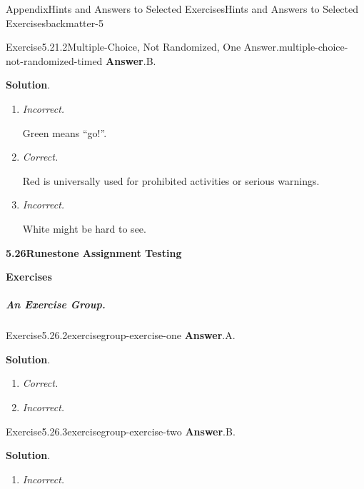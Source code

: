 \documentclass[oneside,10pt,]{book}
\newcommand{\blocktitlefont}{\relax}
\newcommand{\lititle}[1]{{\slshape#1}}
\numberwithin{equation}{section}
\begin{document}
\begin{solutions-chapter}{Appendix}{Hints and Answers to Selected Exercises}{}{Hints and Answers to Selected Exercises}{}{}{backmatter-5}
\begin{divisionsolution}{Exercise}{5.21.2}{Multiple-Choice, Not Randomized, One Answer.}{multiple-choice-not-randomized-timed}
\noindent\textbf{\blocktitlefont Answer}.\hypertarget{multiple-choice-not-randomized-timed-6-back}{}\quad{}B.%
\par\smallskip%
\noindent\textbf{\blocktitlefont Solution}.\hypertarget{multiple-choice-not-randomized-timed-7-back}{}\quad{}%
\begin{enumerate}[label={\Alph*.}]
\item{}\lititle{Incorrect.}\par%
Green means ``go!''.%
\item{}\lititle{Correct.}\par%
Red is universally used for prohibited activities or serious warnings.%
\item{}\lititle{Incorrect.}\par%
White might be hard to see.%
\end{enumerate}
%
\end{divisionsolution}%
\par\medskip
\noindent\textbf{\Large{}5.26\space\textperiodcentered\space{}Runestone Assignment Testing}
\par\medskip
\noindent\textbf{\large{}\textperiodcentered\space{}Exercises}
\subparagraph[{An Exercise Group}]{An Exercise Group.}
\begin{exercisegroup}
\begin{divisionsolutioneg}{Exercise}{5.26.2}{}{exercisegroup-exercise-one}%
\noindent\textbf{\blocktitlefont Answer}.\hypertarget{exercisegroup-exercise-one-2-back}{}\quad{}A.%
\par\smallskip%
\noindent\textbf{\blocktitlefont Solution}.\hypertarget{exercisegroup-exercise-one-3-back}{}\quad{}%
\begin{enumerate}[label={\Alph*.}]
\item{}\lititle{Correct.}\par%
%
\item{}\lititle{Incorrect.}\par%
%
\end{enumerate}
%
\end{divisionsolutioneg}%
\begin{divisionsolutioneg}{Exercise}{5.26.3}{}{exercisegroup-exercise-two}%
\noindent\textbf{\blocktitlefont Answer}.\hypertarget{exercisegroup-exercise-two-2-back}{}\quad{}B.%
\par\smallskip%
\noindent\textbf{\blocktitlefont Solution}.\hypertarget{exercisegroup-exercise-two-3-back}{}\quad{}%
\begin{enumerate}[label={\Alph*.}]
\item{}\lititle{Incorrect.}\par%

\end{enumerate}
\end{divisionsolutioneg}
\end{exercisegroup}
\end{solutions-chapter}
\end{document}
